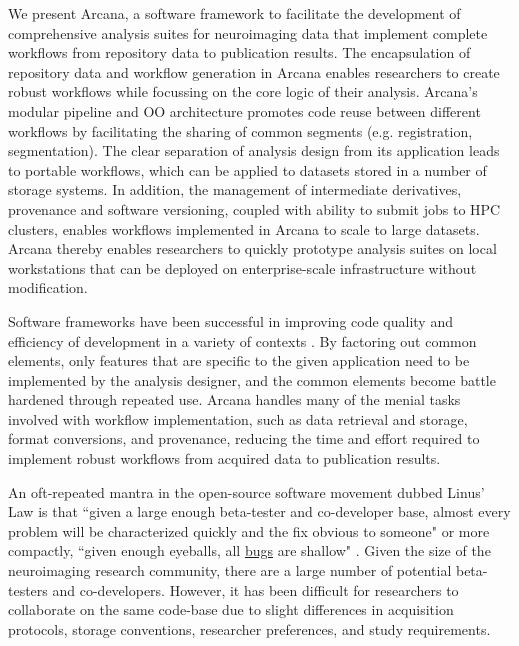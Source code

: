 \documentclass[smallextended]{svjour3}       %
\begin{document}
We present Arcana, a software framework to facilitate the development of
comprehensive analysis suites for neuroimaging data that implement
complete workflows from repository data to publication results. The
encapsulation of repository data and workflow generation in Arcana
enables researchers to create robust workflows while focussing on the
core logic of their analysis. Arcana's modular pipeline and OO
architecture promotes code reuse between different workflows by
facilitating the sharing of common segments (e.g. registration,
segmentation). The clear separation of analysis design from its
application leads to portable workflows, which can be applied to
datasets stored in a number of storage systems. In addition, the
management of intermediate derivatives, provenance and software
versioning, coupled with ability to submit jobs to HPC clusters, enables
workflows implemented in Arcana to scale to large datasets. Arcana
thereby enables researchers to quickly prototype analysis suites on
local workstations that can be deployed on enterprise-scale
infrastructure without modification.

Software frameworks \citep{yacoub_pattern-oriented_2004} have been successful in
improving code quality and efficiency of development in a variety of
contexts \citep{moore_professional_2008,white_hadoop:_2012,abadi_tensorflow:_2016}. By
factoring out common elements, only features that are specific to the
given application need to be implemented by the analysis designer, and
the common elements become battle hardened through repeated use. Arcana
handles many of the menial tasks involved with workflow implementation,
such as data retrieval and storage, format conversions, and provenance,
reducing the time and effort required to implement robust workflows from
acquired data to publication results.

An oft-repeated mantra in the open-source software movement dubbed
Linus' Law is that ``given a large enough beta-tester and co-developer
base, almost every problem will be characterized quickly and the fix
obvious to someone" or more compactly, ``given enough eyeballs, all
\href{https://en.wikipedia.org/wiki/Software_bug}{bugs} are shallow"
\citep{raymond_cathedral_1999}. Given the size of the neuroimaging research community,
there are a large number of potential beta-testers and co-developers.
However, it has been difficult for researchers to collaborate on the
same code-base due to slight differences in acquisition protocols,
storage conventions, researcher preferences, and study requirements.
\end{document}
